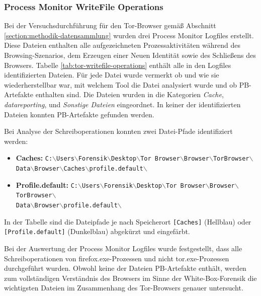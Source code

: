 \begin{appendices}
\subsubsection*{Process Monitor WriteFile Operations}
\label{subsubsection:appendix-tor-common-locations-writefile-operations}
Bei der Versuchsdurchführung für den Tor-Browser gemäß Abschnitt \ref{section:methodik-datensammlung} wurden drei Process Monitor Logfiles erstellt.
Diese Dateien enthalten alle aufgezeichneten Prozessaktivitäten während des Browsing-Szenarios, dem Erzeugen einer \glqq{}Neuen Identität\grqq{} sowie des Schließens des Browsers.
Tabelle \ref{tab:tor-writefile-operations} enthält alle in den Logfiles identifizierten Dateien.
Für jede Datei wurde vermerkt ob und wie sie wiederherstellbar war, mit welchem Tool die Datei analysiert wurde und ob PB-Artefakte enthalten sind.
Die Dateien wurden in die Kategorien \textit{Cache}, \textit{datareporting}, und \textit{Sonstige Dateien} eingeordnet.
In keiner der identifizierten Dateien konnten PB-Artefakte gefunden werden. 

Bei Analyse der Schreiboperationen konnten zwei Datei-Pfade identifiziert werden:
\begin{itemize}
\item \textbf{Caches:} \texttt{C:$\backslash$Users$\backslash$Forensik$\backslash$Desktop$\backslash$Tor Browser$\backslash$Browser$\backslash$TorBrowser$\backslash$\\Data$\backslash$Browser$\backslash$Caches$\backslash$profile.default$\backslash$}
\item \textbf{Profile.default:} \texttt{C:$\backslash$Users$\backslash$Forensik$\backslash$Desktop$\backslash$Tor Browser$\backslash$Browser$\backslash$TorBrowser$\backslash$\\Data$\backslash$Browser$\backslash$profile.default$\backslash$}
\end{itemize}
In der Tabelle sind die Dateipfade je nach Speicherort \texttt{[Caches]} (Hellblau) oder \texttt{[Profile.default]} (Dunkelblau) abgekürzt und eingefärbt. 

Bei der Auswertung der Process Monitor Logfiles wurde festgestellt, dass alle Schreiboperationen von \glqq{}firefox.exe\grqq{}-Prozessen und nicht \glqq{}tor.exe\grqq{}-Prozessen durchgeführt wurden. Obwohl keine der Dateien PB-Artefakte enthält, werden zum vollständigen Verständnis des Browsers im Sinne der White-Box-Forensik die wichtigsten Dateien im Zusammenhang des Tor-Browsers genauer untersucht.


\end{appendices}

